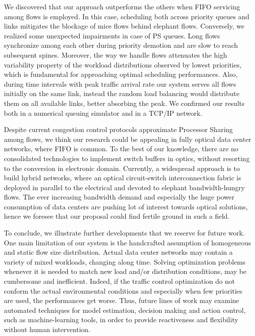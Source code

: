We discovered that our approach outperforms the others when FIFO servicing among flows is employed. In this case, scheduling both across priority queues and links mitigates the blockage of mice flows behind elephant flows. Conversely, we realized some unexpected impairments in case of PS queues. Long flows synchronize among each other during priority demotion and are slow to reach subsequent spines. Moreover,   
the way we handle flows attenuates the high variability property of the workload distributions observed by lowest priorities, which is fundamental for approaching optimal scheduling performances. 
Also, during time intervals with peak traffic arrival rate our system serves all flows initially on the same link, instead the random load balancing would distribute them on all available links, better absorbing the peak. We confirmed our results both in a numerical queuing simulator and in a TCP/IP network. 

Despite current congestion control protocols approximate Processor Sharing among flows, we think our research could be appealing in fully optical data center networks, where FIFO is common. To the best of our knowledge, there are no consolidated technologies to implement switch buffers in optics, without resorting to the conversion in electronic domain. Currently, a widespread approach is to build hybrid networks, where an optical circuit-switch interconnection fabric is deployed in parallel to the electrical and devoted to elephant bandwidth-hungry flows. The ever increasing bandwidth demand and especially the huge power consumption of data centers are pushing lot of interest towards optical solutions, hence we foresee that our proposal could find fertile ground in such a field.

To conclude, we illustrate further developments that we reserve for future work. One main limitation of our system is the handcrafted assumption of homogeneous and static flow size distribution. Actual data center networks may contain a variety of mixed workloads, changing along time. Solving optimization problems whenever it is needed to match new load and/or distribution conditions, may be cumbersome and inefficient. Indeed, if the traffic control optimization do not conform the actual environmental conditions and especially when few priorities are used, the performances get worse. Thus, future lines of work may examine automated techniques for model estimation, decision making and action control, such as machine-learning tools, in order to provide reactiveness and flexibility without human intervention. 
